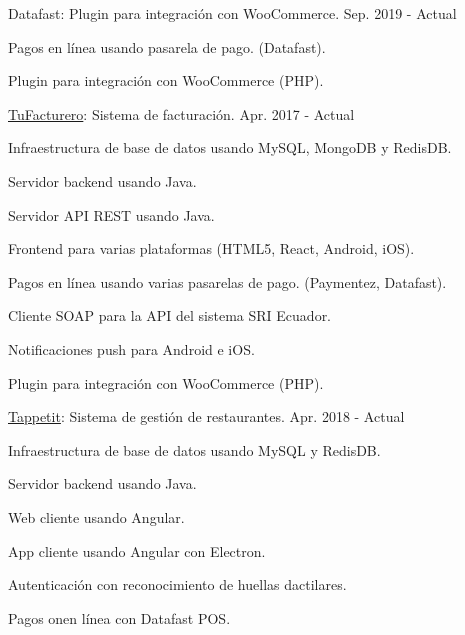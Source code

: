 \begin{cventries}
  \cventry
    {Datafast: Plugin para integración con WooCommerce.} %
    {} %
    {} %
    {Sep. 2019 - Actual} %
    {
      \begin{cvitems} %
        \item {Pagos en línea usando pasarela de pago. (Datafast).}
        \item {Plugin para integración con WooCommerce (PHP).}
      \end{cvitems}
    }

  \cventry
    {\href{https://tufacturero.ec}{TuFacturero}: Sistema de facturación.} %
    {} %
    {} %
    {Apr. 2017 - Actual} %
    {
      \begin{cvitems} %
        \item {Infraestructura de base de datos usando MySQL, MongoDB y RedisDB.}
        \item {Servidor backend usando Java.}
        \item {Servidor API REST usando Java.}
        \item {Frontend para varias plataformas (HTML5, React, Android, iOS).}
        \item {Pagos en línea usando varias pasarelas de pago. (Paymentez, Datafast).}
        \item {Cliente SOAP para la API del sistema SRI Ecuador.}
        \item {Notificaciones push para Android e iOS.}
        \item {Plugin para integración con WooCommerce (PHP).}
      \end{cvitems}
    }

  \cventry
    {\href{https://tappetit.com}{Tappetit}: Sistema de gestión de restaurantes.} %
    {} %
    {} %
    {Apr. 2018 - Actual} %
    {
      \begin{cvitems} %
        \item {Infraestructura de base de datos usando MySQL y RedisDB.}
        \item {Servidor backend usando Java.}
        \item {Web cliente usando Angular.}
        \item {App cliente usando Angular con Electron.}
        \item {Autenticación con reconocimiento de huellas dactilares.}
        \item {Pagos onen línea con Datafast POS.}
      \end{cvitems}
    }


\end{cventries}
